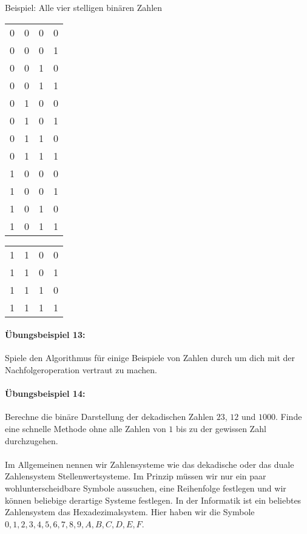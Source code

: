 \documentclass[11pt,a4paper,leqno]{report}
\numberwithin{equation}{chapter}
\begin{document}
Beispiel: Alle vier stelligen binären Zahlen
\begin{center}
	\begin{tabular}{c c c c}
		0 & 0 & 0 & 0\\
		0 & 0 & 0 & 1\\
		0 & 0 & 1 & 0\\
		0 & 0 & 1 & 1\\
		0 & 1 & 0 & 0\\
		0 & 1 & 0 & 1\\
		0 & 1 & 1 & 0\\
		0 & 1 & 1 & 1\\
		1 & 0 & 0 & 0\\
		1 & 0 & 0 & 1\\
		1 & 0 & 1 & 0\\
		1 & 0 & 1 & 1\\
	\end{tabular} 

	\begin{tabular}{c c c c}
		1 & 1 & 0 & 0\\
		1 & 1 & 0 & 1\\
		1 & 1 & 1 & 0\\
		1 & 1 & 1 & 1\\
	\end{tabular}  
\end{center}
\paragraph{Übungsbeispiel 13:} Spiele den Algorithmus für einige Beispiele von Zahlen durch um dich mit der Nachfolgeroperation vertraut zu machen.
\paragraph{Übungsbeispiel 14:} Berechne die binäre Darstellung der dekadischen Zahlen $23$, $12$ und $1000$. Finde eine schnelle Methode ohne alle Zahlen von $1$ bis zu der gewissen Zahl durchzugehen.\\
\\
Im Allgemeinen nennen wir Zahlensysteme wie das dekadische oder das duale Zahlensystem Stellenwertsysteme. Im Prinzip müssen wir nur ein paar wohlunterscheidbare Symbole aussuchen, eine Reihenfolge festlegen und wir können beliebige derartige Systeme festlegen. In der Informatik ist ein beliebtes Zahlensystem das Hexadezimalsystem. Hier haben wir die Symbole $0, 1, 2, 3, 4, 5, 6, 7, 8, 9, A, B, C, D, E, F$.
\end{document}
